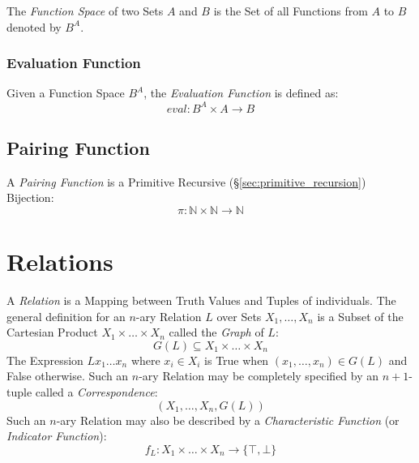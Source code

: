 The \emph{Function Space} of two Sets $A$ and $B$ is the Set of all
Functions from $A$ to $B$ denoted by $B^A$.



\subsubsection{Evaluation Function}\label{sec:evaluation_function}

Given a Function Space $B^A$, the \emph{Evaluation Function} is
defined as:
\[
    eval : B^A \times A \rightarrow B
\]



\subsection{Pairing Function}\label{sec:pairing_function}

A \emph{Pairing Function} is a Primitive Recursive
(\S\ref{sec:primitive_recursion}) Bijection:
\[
    \pi : \mathbb{N} \times \mathbb{N} \rightarrow \mathbb{N}
\]



\section{Relations}\label{sec:set_relation}

A \emph{Relation} is a Mapping between Truth Values and Tuples of
individuals. The general definition for an $n$-ary Relation $L$ over
Sets $X_1, \ldots, X_n$ is a Subset of the Cartesian Product $X_1
\times \ldots \times X_n$ called the \emph{Graph} of $L$:
\[
    G(L) \subseteq X_1 \times \ldots \times X_n
\]
The Expression $L x_1 \ldots x_n$ where $x_i \in X_i$ is True when
$(x_1, \ldots, x_n) \in G(L)$ and False otherwise. Such an $n$-ary
Relation may be completely specified by an $n + 1$-tuple called a
\emph{Correspondence}:
\[
    (X_1, \ldots, X_n, G(L))
\]
Such an $n$-ary Relation may also be described by a
\emph{Characteristic Function} (or \emph{Indicator Function}): %
\[
    f_L : X_1 \times \ldots \times X_n \rightarrow \{\top,\bot\}
\]



